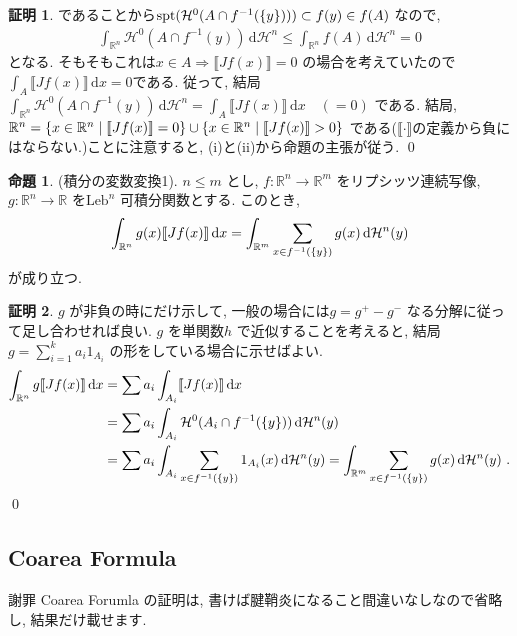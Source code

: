 \documentclass[twocolumn, landscape, a4paper , 8pt, fleqn, titlepage ]{jsarticle}
\theoremstyle{definition}
\newtheorem{prop}[dfn]{命題}
\newtheorem*{pf*}{証明}
\newcommand{\cbra}[1]{\mleft\{#1\mright\}}
\newcommand{\dbra}[1]{\llbracket #1 \rrbracket}
\newcommand{\naraba}{\Rightarrow}
\newcommand{\Leb}{\textrm{Leb}}
\renewcommand{\d}{\, \textrm{d} }
\newcommand{\spt}{\textrm{spt}}
\renewcommand{\-}{\hyphen}
\begin{document}
\begin{pf*}
であることから$\spt (\mathcal H^0(A\cap f^{-1}(\cbra{y})))  \subset  f(y) \in f(A) $ 
なので, 
\begin{align*}  \int_{\mathbb R^n} \mathcal H^0 (A \cap f^{-1}(y)) \d \mathcal H^n \leq \int_{\mathbb R^n} f(A) \d \mathcal H^n =  0 \end{align*}
となる. そもそもこれは$x\in A \naraba \dbra{Jf(x)} = 0$ の場合を考えていたので$\int_A \dbra{Jf(x)} \d x = 0 $である. 従って, 結局$ \int_{\mathbb R^n} \mathcal H^0 (A \cap f^{-1}(y)) \d \mathcal H^n =  \int_A \dbra{Jf(x)} \d x \quad (= 0)$ である. 結局, $\mathbb R^n = \cbra{x \in \mathbb R^n \mid \dbra{Jf(x)} = 0} \cup \cbra{x \in \mathbb R^n \mid \dbra{Jf(x)} > 0} $ である($\dbra{\cdot}$の定義から負にはならない.)ことに注意すると, (i)と(ii)から命題の主張が従う. 
\qed
\end{pf*}

\begin{prop}\label{11}(積分の変数変換1).
$n \leq m$ とし, $f: \mathbb R^n \rightarrow \mathbb R^m$ をリプシッツ連続写像, $g:\mathbb R^n \rightarrow \mathbb R$ を$\Leb^n$ 可積分関数とする. このとき, 
\begin{align*} \int_{\mathbb R^n} g(x) \dbra{Jf(x)} \d x = \int_{\mathbb R^m} \sum_{x \in f^{-1} (\cbra{y})} g(x) \d \mathcal H^n (y) \end{align*}
が成り立つ. 
\end{prop}
\begin{pf*}
$g$ が非負の時にだけ示して, 一般の場合には$g = g^+ - g^-$ なる分解に従って足し合わせれば良い. $g$ を単関数$h$ で近似することを考えると, 結局$g = \sum_{i=1} ^k  a_i 1_{A_i}$ の形をしている場合に示せばよい. 
\begin{align*} \int_{\mathbb R^n} g \dbra{Jf(x)} \d x &= \sum a_i \int_{A_i} \dbra{Jf(x)} \d x \\ &= \sum a_i \int _{A_i} \mathcal H^0 (A_i \cap f^{-1} (\cbra{y})) \d \mathcal H^n (y) \\&= \sum a_i \int_{A_i} \sum_{x \in f^{-1}(\cbra{y})} 1_{A_i} (x) \d \mathcal H^n (y) = \int_{\mathbb R^m} \sum_{x\in f^{-1} (\cbra{y})} g(x) \d \mathcal H^n (y)  \,\, . \end{align*}
\qed
\end{pf*}


\subsection{Coarea Formula}

\begin{itembox}[l]{謝罪}
Coarea Forumla の証明は, 書けば腱鞘炎になること間違いなしなので省略し, 結果だけ載せます.
\end{itembox}
\end{document}
